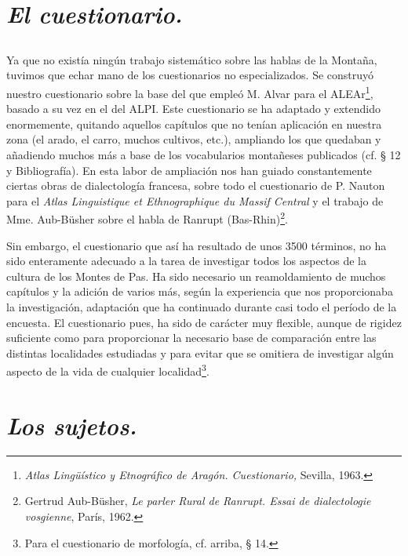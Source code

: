 \documentclass[11pt,spanish,b5paper]{book}
\begin{document}
\section{\emph{El cuestionario.}}

\subsection{} Ya que no existía ningún trabajo sistemático sobre las hablas de la Montaña, tuvimos que echar mano de los cuestionarios no especializados. Se construyó nuestro cuestionario sobre la base del que empleó M. Alvar para el ALEAr\footnote{\textit{Atlas Lingüístico y Etnográfico de Aragón. Cuestionario,} Sevilla, 1963.}, basado a su vez en el del ALPI. Este cuestionario se ha adaptado y extendido enormemente, quitando aquellos capítulos que no tenían aplicación en nuestra zona (el arado, el carro, muchos cultivos, etc.), ampliando los que quedaban y añadiendo muchos más a base de los vocabularios montañeses publicados (cf. § 12 y Bibliografía). En esta labor de ampliación nos han guiado constantemente ciertas obras de dialectología francesa, sobre todo el cuestionario de P. Nauton para el \textit{Atlas Linguistique et Ethnographique du Massif Central} y el trabajo de Mme. Aub-Büsher sobre el habla de Ranrupt (Bas-Rhin)\footnote{Gertrud Aub-Büsher, \textit{Le parler Rural de Ranrupt. Essai de dialectologie vosgienne}, París, 1962.}.

Sin embargo, el cuestionario que así ha resultado de unos 3500 términos, no ha sido enteramente adecuado a la tarea de investigar todos los aspectos de la cultura de los Montes de Pas. Ha sido necesario un reamoldamiento de muchos capítulos y la adición de varios más, según la experiencia que nos proporcionaba la investigación, adaptación que ha continuado durante casi todo el período de la encuesta. El cuestionario pues, ha sido de carácter muy flexible, aunque de rigidez suficiente como para proporcionar la necesario base de comparación entre las distintas localidades estudiadas y para evitar que se omitiera de investigar algún aspecto de la vida de cualquier localidad\footnote{Para el cuestionario de morfología, cf. arriba, § 14.}.


\section{\emph{Los sujetos.}}
\end{document}
